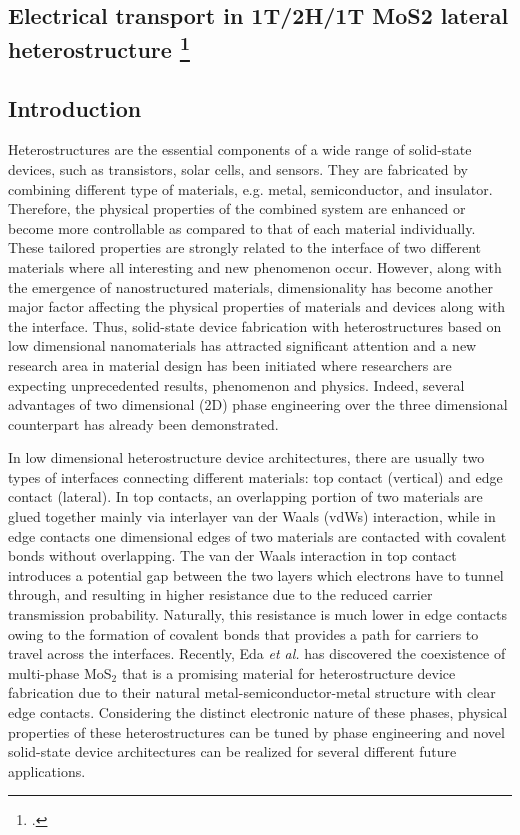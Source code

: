 \subsection[Electrical transport in 1T/2H/1T MoS2 lateral heterostructure]{Electrical transport in 1T/2H/1T MoS2 lateral heterostructure \footcite[This work is submitted as:][]{Aierken2017.transport}}

\subsection{Introduction}
Heterostructures are the essential components of a wide range of solid-state devices, such as transistors, solar cells, and sensors\cite{singh1993,agostini2011}. They are  fabricated by combining different type of materials, e.g. metal, semiconductor, and insulator. Therefore, the physical properties of the combined system are enhanced or become more controllable as compared to that of each material individually. These tailored properties are strongly related to the interface of two different materials where all interesting and new phenomenon occur. However, along with the emergence of nanostructured materials, dimensionality has become another major factor affecting the physical properties of materials and devices along with the interface. Thus, solid-state device fabrication with heterostructures based on low dimensional nanomaterials has attracted significant attention and a new research area in material design has been initiated where researchers are expecting unprecedented results, phenomenon and physics\cite{Gan2013,Wu2015c,DiBartolomeo2016}. Indeed, several advantages of two dimensional (2D) phase engineering over the three dimensional counterpart has already been demonstrated.\cite{Duerloo2015}

In low dimensional heterostructure device architectures, there are usually two types of interfaces connecting different materials: top contact (vertical) and edge contact (lateral)\cite{Allain2015}. In top contacts, an overlapping portion of two materials are glued together mainly via interlayer van der Waals (vdWs) interaction, while in edge contacts one dimensional edges of two materials are contacted with covalent bonds without overlapping. The van der Waals interaction in top contact introduces a potential gap between the two layers which electrons have to tunnel through, and resulting in higher resistance due to the reduced carrier transmission probability. Naturally, this resistance is much lower in edge contacts owing to the formation of covalent bonds that provides a path for carriers to travel across the interfaces\cite{Matsuda2010,Kang2014}. Recently, Eda \textit{et al.}  has discovered the coexistence of multi-phase MoS$_2$ that is a promising material for heterostructure device fabrication due to their natural metal-semiconductor-metal structure with clear edge contacts\cite{Eda2012}. Considering the distinct electronic nature of these phases, physical properties of these heterostructures\cite{Kappera2014,Fan2015} can be tuned by phase engineering and novel solid-state device architectures can be realized for several different future applications.

